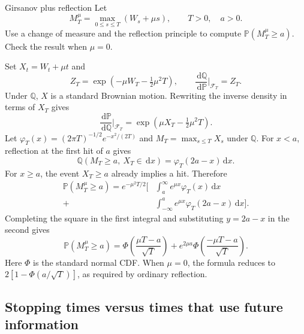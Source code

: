\documentclass[10pt]{article}
\newcommand{\Pp}{\mathbb P}
\newcommand{\Q}{\mathbb Q}
\newcommand{\1}{\mathbf 1}
\newcommand{\cF}{\mathcal F}
\newcommand{\dd}{\,\mathrm d}
\theoremstyle{definition}
\begin{document}
\begin{studentexercise}{Girsanov plus reflection}
Let
\[
M_T^\mu=\max_{0\leq s\leq T}(W_s+\mu s),
\qquad T>0,\quad a>0.
\]
Use a change of measure and the reflection principle to compute
\(\Pp(M_T^\mu\geq a)\). Check the result when \(\mu=0\).
\end{studentexercise}
\begin{shortsolution}
Set \(X_t=W_t+\mu t\) and
\[
Z_T=\exp(-\mu W_T-\tfrac12\mu^2T),
\qquad
\frac{\dd\Q}{\dd\Pp}\bigg|_{\cF_T}=Z_T.
\]
Under \(\Q\), \(X\) is a standard Brownian motion. Rewriting the inverse
density in terms of \(X_T\) gives
\[
\frac{\dd\Pp}{\dd\Q}\bigg|_{\cF_T}
=\exp(\mu X_T-\tfrac12\mu^2T).
\]
Let \(\varphi_T(x)=(2\pi T)^{-1/2}e^{-x^2/(2T)}\) and
\(M_T=\max_{s\leq T}X_s\) under \(\Q\). For \(x<a\), reflection at the first
hit of \(a\) gives
\[
\Q(M_T\geq a,\ X_T\in\dd x)=\varphi_T(2a-x)\dd x.
\]
For \(x\geq a\), the event \(X_T\geq a\) already implies a hit. Therefore
\[
\begin{aligned}
\Pp(M_T^\mu\geq a)
=e^{-\mu^2T/2}\bigg[
&\int_a^\infty e^{\mu x}\varphi_T(x)\dd x\\
+&\int_{-\infty}^a e^{\mu x}\varphi_T(2a-x)\dd x
\bigg].
\end{aligned}
\]
Completing the square in the first integral and substituting \(y=2a-x\)
in the second gives
\[
\boxed{
\Pp(M_T^\mu\geq a)
=\Phi\!\left(\frac{\mu T-a}{\sqrt T}\right)
+e^{2\mu a}\Phi\!\left(\frac{-\mu T-a}{\sqrt T}\right).}
\]
Here \(\Phi\) is the standard normal CDF. When \(\mu=0\), the formula
reduces to \(2[1-\Phi(a/\sqrt T)]\), as required by ordinary reflection.
\end{shortsolution}

\subsection{Stopping times versus times that use future information}
\end{document}

